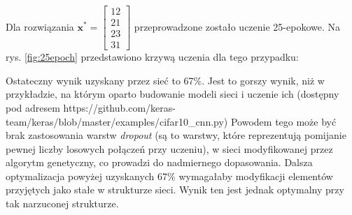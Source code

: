 Dla rozwiązania $\mathbf{x^*} = \begin{bmatrix}12 \\ 21 \\ 23 \\ 31\end{bmatrix}$ przeprowadzone zostało uczenie 25-epokowe.
Na rys. \ref{fig:25epoch} przedstawiono krzywą uczenia dla tego przypadku:

Ostateczny wynik uzyskany przez sieć to 67\%.
Jest to gorszy wynik, niż w przykładzie, na którym oparto budowanie modeli sieci i uczenie ich (dostępny pod adresem https://github.com/keras-team/keras/blob/master/examples/cifar10\_cnn.py)
Powodem tego może być brak zastosowania warstw \textit{dropout} (są to warstwy, które reprezentują pomijanie pewnej liczby losowych połączeń przy uczeniu), w sieci modyfikowanej przez algorytm genetyczny, co prowadzi do nadmiernego dopasowania.
Dalsza optymalizacja powyżej uzyskanych 67\% wymagałaby modyfikacji elementów przyjętych jako stałe w strukturze sieci.
Wynik ten jest jednak optymalny przy tak narzuconej strukturze.
